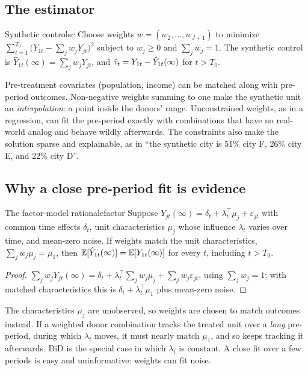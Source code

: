 \documentclass[11pt]{article}
\begin{document}
\subsection{The estimator}

\begin{defn}{Synthetic control}{sc}
Choose weights $w = (w_2, \dots, w_{J+1})$ to minimize $\sum_{t=1}^{T_0}\big(Y_{1t} - \sum_j w_jY_{jt}\big)^2$ subject to $w_j \ge 0$ and
$\sum_j w_j = 1$. The synthetic control is $\hat Y_{1t}(\infty) = \sum_j w_jY_{jt}$, and $\hat{\tau}_t = Y_{1t} - \hat Y_{1t}(\infty)$ for $t > T_0$.
\end{defn}

Pre-treatment covariates (population, income) can be matched along with pre-period outcomes. Non-negative weights summing to one make the
synthetic unit an \emph{interpolation}: a point inside the donors' range. Unconstrained weights, as in a regression, can fit the pre-period
exactly with combinations that have no real-world analog and behave wildly afterwards. The constraints also make the solution sparse
and explainable, as in ``the synthetic city is 51\% city F, 26\% city E, and 22\% city D''.

\subsection{Why a close pre-period fit is evidence}

\begin{prop}{The factor-model rationale}{factor}
Suppose $Y_{jt}(\infty) = \delta_t + \lambda_t^\top\mu_j + \varepsilon_{jt}$ with common time effects $\delta_t$, unit characteristics $\mu_j$ whose influence
$\lambda_t$ varies over time, and mean-zero noise. If weights match the unit characteristics, $\sum_j w_j\mu_j = \mu_1$, then
$\mathbb{E}[\hat Y_{1t}(\infty)] = \mathbb{E}[Y_{1t}(\infty)]$ for every $t$, including $t > T_0$.
\end{prop}
\begin{proof}
$\sum_j w_jY_{jt}(\infty) = \delta_t + \lambda_t^\top\sum_j w_j\mu_j + \sum_j w_j\varepsilon_{jt}$, using $\sum_j w_j = 1$; with matched characteristics this is
$\delta_t + \lambda_t^\top\mu_1$ plus mean-zero noise.
\end{proof}

The characteristics $\mu_j$ are unobserved, so weights are chosen to match outcomes instead. If a weighted donor combination tracks the treated
unit over a \emph{long} pre-period, during which $\lambda_t$ moves, it must nearly match $\mu_1$, and so keeps tracking it afterwards. DiD is the
special case in which $\lambda_t$ is constant. A close fit over a few periods is easy and uninformative: weights can fit noise.
\end{document}
